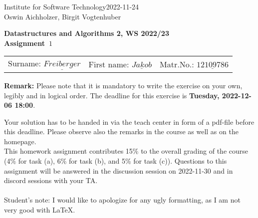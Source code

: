 \documentclass[9pt]{article}
\begin{document}
\def\mod{\mbox{\, mod\, }}
\def\N{\bf N}

{\sc Institute for Software Technology\hfill 2022-11-24}\\[.1cm]
Oswin Aichholzer, Birgit Vogtenhuber\\

\begin{center}
{\Large\bf Datastructures and Algorithms 2, WS 2022/23\\[0.1cm]
Assignment~$1$}\\

\end{center}

\color{blue}
{\bf\it
\vspace{1ex}
\hspace{-1ex}\begin{tabular}{lll}

Surname:  ${\underline{Freiberger}}$ & First name:  ${\underline{Jakob}}$ & Matr.No.:  ${\underline{12109786}}$ \\
\end{tabular}
}
\color{black}

{\bf Remark:}  Please note that it is mandatory to write the exercise on your own, legibly and in logical order.
The deadline for this exercise is {\bf Tuesday, 2022-12-06 18:00}. 

Your solution has to be handed in via the teach center in form of a pdf-file before this deadline.
Please observe also the remarks in the course as well as on the homepage.\\
This homework assignment contributes 15\% to the overall grading of the course (4\% for task (a), 6\% for task (b), and 5\% for task (c)).
Questions to this assignment will be answered in the discussion session on 2022-11-30 and in discord sessions with your TA. \\
\\
\color{blue}
Student's note: I would like to apologize for any ugly formatting, as I am not very good with LaTeX.
\color{black}
\vspace{4ex}
\end{document}
